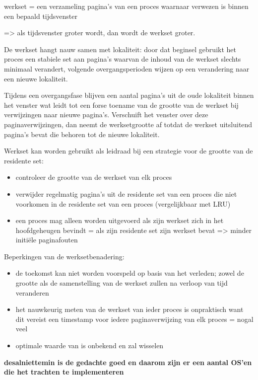 werkset = een verzameling pagina's van een proces waarnaar verwezen is binnen een bepaald tijdsvenster

=> als tijdsvenster groter wordt, dan wordt de werkset groter.

De werkset hangt nauw samen met lokaliteit: door dat beginsel gebruikt het proces een stabiele set aan pagina's waarvan de inhoud van de werkset slechts minimaal verandert, volgende overgangsperioden wijzen op een verandering naar een nieuwe lokaliteit.


Tijdens een overgangsfase blijven een aantal pagina's uit de oude lokaliteit binnen het venster wat leidt tot een forse toename van de grootte van de werkset bij verwijzingen naar nieuwe pagina's. Verschuift het venster over deze paginaverwijzingen, dan neemt de werksetgrootte af totdat de werkset uitsluitend pagina's bevat die behoren tot de nieuwe lokaliteit.

Werkset kan worden gebruikt als leidraad bij een strategie voor de grootte van de residente set:

\begin{itemize}
\item controleer de grootte van de werkset van elk proces
\item verwijder regelmatig pagina's uit de residente set van een proces die niet voorkomen in de residente set van een proces (vergelijkbaar met LRU)
\item een proces mag alleen worden uitgevoerd als zijn werkset zich in het hoofdgeheugen bevindt = als zijn residente set zijn werkset bevat => minder initiële paginafouten
\end{itemize}

Beperkingen van de werksetbenadering:

\begin{itemize}
\item de toekomst kan niet worden voorspeld op basis van het verleden; zowel de grootte als de samenstelling van de werkset zullen na verloop van tijd veranderen
\item het nauwkeurig meten van de werkset van ieder proces is onpraktisch want dit vereist een timestamp voor iedere paginaverwijzing van elk proces = nogal veel
\item optimale waarde van is onbekend en zal wisselen
\end{itemize}

\textbf{desalniettemin is de gedachte goed en daarom zijn er een aantal OS'en die het trachten te implementeren}

